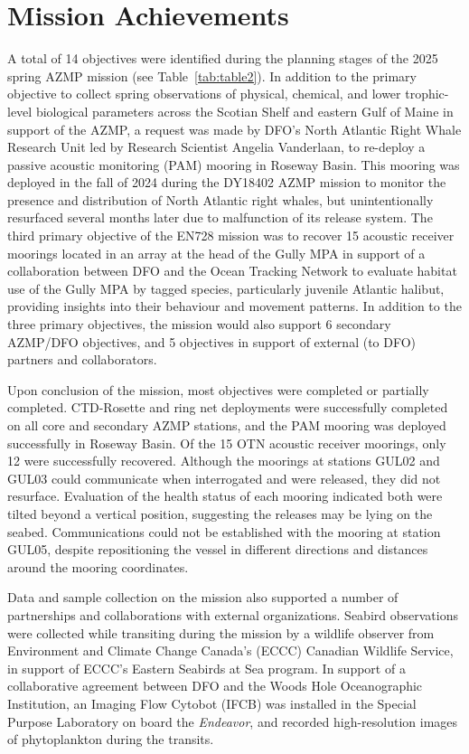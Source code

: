 \documentclass[12pt]{article}\usepackage[]{graphicx}\usepackage[]{color}
\begin{document}
\section{Mission Achievements}\label{mission-achievements}

A total of 14 objectives were identified during the planning stages of the 2025 spring AZMP mission (see Table~\ref{tab:table2}). In addition to the primary objective to collect spring observations of physical, chemical, and lower trophic-level biological parameters across the Scotian Shelf and eastern Gulf of Maine in support of the AZMP, a request was made by DFO's North Atlantic Right Whale Research Unit led by Research Scientist Angelia Vanderlaan, to re-deploy a passive acoustic monitoring (PAM) mooring in Roseway Basin. This mooring was deployed in the fall of 2024 during the DY18402 AZMP mission to monitor the presence and distribution of North Atlantic right whales, but unintentionally resurfaced several months later due to malfunction of its release system. The third primary objective of the EN728 mission was to recover 15 acoustic receiver moorings located in an array at the head of the Gully MPA in support of a collaboration between DFO and the Ocean Tracking Network to evaluate habitat use of the Gully MPA by tagged species, particularly juvenile Atlantic halibut, providing insights into their behaviour and movement patterns. In addition to the three primary objectives, the mission would also support 6 secondary AZMP/DFO objectives, and 5 objectives in support of external (to DFO) partners and collaborators.

Upon conclusion of the mission, most objectives were completed or partially completed. CTD-Rosette and ring net deployments were successfully completed on all core and secondary AZMP stations, and the PAM mooring was deployed successfully in Roseway Basin. Of the 15 OTN acoustic receiver moorings, only 12 were successfully recovered. Although the moorings at stations GUL02 and GUL03 could communicate when interrogated and were released, they did not resurface. Evaluation of the health status of each mooring indicated both were tilted beyond a vertical position, suggesting the releases may be lying on the seabed. Communications could not be established with the mooring at station GUL05, despite repositioning the vessel in different directions and distances around the mooring coordinates.

Data and sample collection on the mission also supported a number of partnerships and collaborations with external organizations. Seabird observations were collected while transiting during the mission by a wildlife observer from Environment and Climate Change Canada's (ECCC) Canadian Wildlife Service, in support of ECCC's Eastern Seabirds at Sea program. In support of a collaborative agreement between DFO and the Woods Hole Oceanographic Institution, an Imaging Flow Cytobot (IFCB) was installed in the Special Purpose Laboratory on board the \emph{Endeavor}, and recorded high-resolution images of phytoplankton during the transits.
\end{document}
